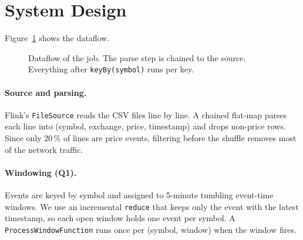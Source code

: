 \documentclass[sigconf,nonacm]{acmart}
\begin{document}
\section{System Design}\label{sec:design}
Figure~\ref{fig:pipeline} shows the dataflow.

\begin{figure}[t]
\centering
{}
\caption{Dataflow of the job. The parse step is chained to the source.
Everything after \texttt{keyBy(symbol)} runs per key.}\label{fig:pipeline}
\end{figure}

\paragraph{Source and parsing.} Flink's \texttt{FileSource} reads the CSV
files line by line. A chained flat-map parses each line into
(symbol, exchange, price, timestamp) and drops non-price rows. Since only
20\,\% of lines are price events, filtering before the shuffle removes most
of the network traffic.

\paragraph{Windowing (Q1).} Events are keyed by symbol and assigned to
5-minute tumbling event-time windows. We use an incremental \texttt{reduce}
that keeps only the event with the latest timestamp, so each open window holds
one event per symbol. A \texttt{ProcessWindowFunction} runs once per
(symbol, window) when the window fires.
\end{document}
